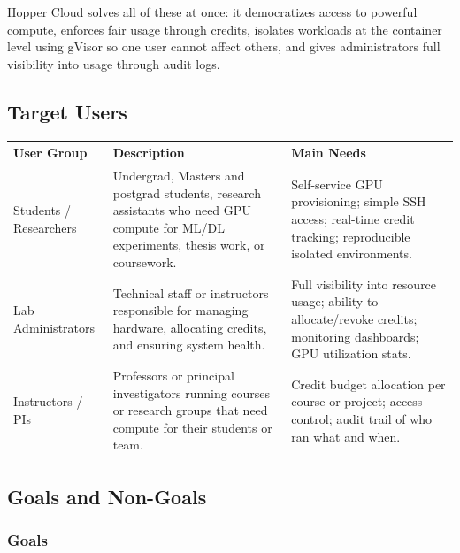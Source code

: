 \documentclass[12pt,a4paper]{article}
\begin{document}
Hopper Cloud solves all of these at once: it democratizes access to powerful compute, enforces fair usage through credits, isolates workloads at the container level using gVisor so one user cannot affect others, and gives administrators full visibility into usage through audit logs.

\subsection{Target Users}

\begin{tabularx}{\textwidth}{@{}L{3.5cm}L{5cm}X@{}}
  \textbf{User Group} & \textbf{Description} & \textbf{Main Needs} \\
  \midrule
  Students / Researchers
    & Undergrad, Masters and postgrad students, research assistants who need GPU compute for ML/DL experiments, thesis work, or coursework.
    & Self-service GPU provisioning; simple SSH access; real-time credit tracking; reproducible isolated environments. \\
  Lab Administrators
    & Technical staff or instructors responsible for managing hardware, allocating credits, and ensuring system health.
    & Full visibility into resource usage;    ability to allocate/revoke credits; monitoring dashboards; GPU utilization stats. \\
  
  Instructors / PIs
    & Professors or principal investigators running courses or research groups that need compute for their students or team.
    & Credit budget allocation per course or project; access control; audit trail of who ran what and when. \\
\end{tabularx}

\subsection{Goals and Non-Goals}

\subsubsection*{Goals}
\end{document}
